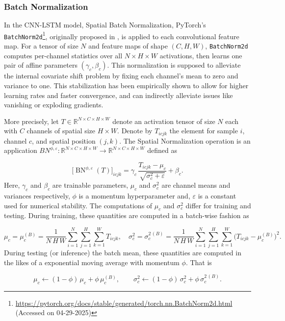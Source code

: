 \documentclass[10pt,a4paper,oneside]{article}
\newcommand{\R}{\mathbb{R}}
\DeclareMathOperator{\batchnorm}{BN}
\begin{document}
\subsubsection{Batch Normalization}

In the CNN-LSTM model, Spatial Batch Normalization, PyTorch’s \texttt{BatchNorm2d}\footnote{\url{https://pytorch.org/docs/stable/generated/torch.nn.BatchNorm2d.html} (Accessed on 04-29-2025)}, originally proposed in \cite{ioffe2015}, is applied to each convolutional feature map. For a tensor of size $N$ and feature maps of shape $(C,H,W)$, \texttt{BatchNorm2d} computes per-channel statistics over all $N\times H\times W$ activations, then learns one pair of affine parameters $(\gamma_c,\beta_c)$. This normalization is supposed to alleviate the internal covariate shift problem by fixing each channel’s mean to zero and variance to one. This stabilization has been empirically shown to allow for higher learning rates and faster convergence, and can indirectly alleviate issues like vanishing or exploding gradients. 

More precisely, let $T\in\mathbb{R}^{N\times C\times H\times W}$ denote an activation tensor of size $N$ each with $C$ channels of spatial size $H\times W$.  Denote by $T_{icjk}$ the element for sample $i$, channel $c$, and spatial position $(j,k)$. The Spatial Normalization operation is an application $BN^{\phi, \varepsilon} : \R^{N \times C\times H\times W} \rightarrow \R^{N \times C\times H\times W}$ defined as 

\[
\bigl[\batchnorm^{\phi, \varepsilon}(T)\bigr]_{icjk}
= \gamma_c \, \frac{T_{icjk} - \mu_c}{\sqrt{\sigma_c^{2} + \varepsilon}} + \beta_c.
\]
Here, $\gamma_c$ and $\beta_c$ are trainable parameters, $\mu_c$ and $\sigma^2_c$ are channel means and variances respectively, $\phi$ is a momentum hyperparameter and, $\varepsilon$ is a constant used for numerical stability. The computations of $\mu_c$ and $\sigma^2_c$ differ for training and testing. During training, these quantities are computed in a batch-wise fashion as

\[
\mu_c = \mu_c^{(B)} 
= \frac{1}{N\,H\,W}
  \sum_{i=1}^N \sum_{j=1}^H \sum_{k=1}^W
    T_{icjk},
\quad
\sigma_c^{2} = \sigma_c^{2\,(B)} 
= \frac{1}{N\,H\,W}
  \sum_{i=1}^N \sum_{j=1}^H \sum_{k=1}^W
    \bigl(T_{icjk} - \mu_c^{(B)}\bigr)^2.
\]
During testing (or inference) the batch mean, these quantities are computed in the likes of a exponential moving average with momentum $\phi$. That is

\[
\mu_c \leftarrow (1-\phi)\,\mu_c + \phi\,\mu_c^{(B)},
\qquad
\sigma_c^2 \leftarrow (1-\phi)\,\sigma_c^2 + \phi\,\sigma_c^{2\,(B)}.
\]
\end{document}
